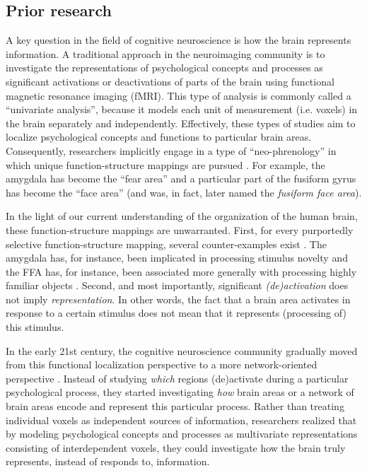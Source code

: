 \documentclass[12pt,a4paper]{article}\usepackage[]{graphicx}\usepackage[]{color}
\begin{document}
\subsection{Prior research}
A key question in the field of cognitive neuroscience is how the brain represents information. A traditional approach in the neuroimaging community is to investigate the representations of psychological concepts and processes as significant activations or deactivations of parts of the brain using functional magnetic resonance imaging (fMRI). This type of analysis is commonly called a ``univariate analysis'', because it models each unit of measurement (i.e. voxels) in the brain separately and independently. Effectively, these types of studies aim to localize psychological concepts and functions to particular brain areas. Consequently, researchers implicitly engage in a type of ``neo-phrenology'' in which unique function-structure mappings are pursued \citep{poldrack2010}. For example, the amygdala has become the ``fear area'' \citep{ledoux2003} and a particular part of the fusiform gyrus has become the ``face area'' (and was, in fact, later named the \emph{fusiform face area}).  

In the light of our current understanding of the organization of the human brain, these function-structure mappings are unwarranted. First, for every purportedly selective function-structure mapping, several counter-examples exist \citep{poldrack2010}. The amygdala has, for instance, been implicated in processing stimulus novelty \citep{blackford2010} and the FFA has, for instance, been associated more generally with processing highly familiar objects \citep{tarr2000}. Second, and most importantly, significant \emph{(de)activation} does not imply \emph{representation}. In other words, the fact that a brain area activates in response to a certain stimulus does not mean that it represents (processing of) this stimulus.   

In the early 21st century, the cognitive neuroscience community gradually moved from this functional localization perspective to a more network-oriented perspective \citep{sporns2002,barrett2013}. Instead of studying \emph{which} regions (de)activate during a particular psychological process, they started investigating \emph{how} brain areas or a network of brain areas encode and represent this particular process. Rather than treating individual voxels as independent sources of information, researchers realized that by modeling psychological concepts and processes as multivariate representations consisting of interdependent voxels, they could investigate how the brain truly represents, instead of responds to, information.
\end{document}
